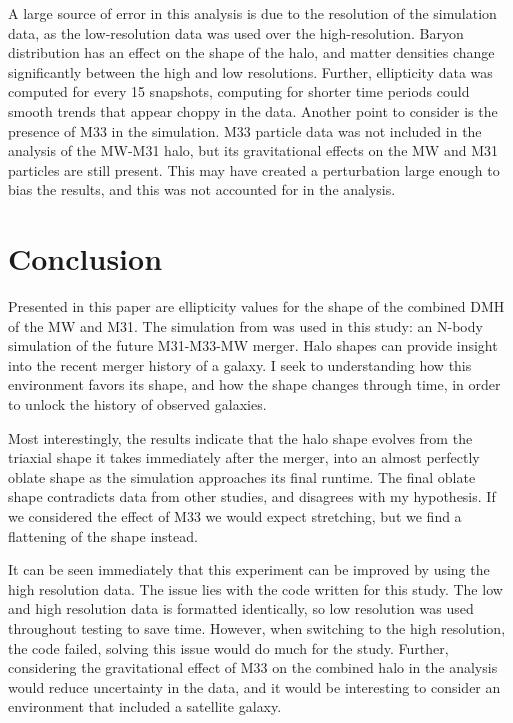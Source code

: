 \documentclass[fleqn,usenatbib]{mnras}
\begin{document}
A large source of error in this analysis is due to the resolution of the simulation data, as the low-resolution data was used over the high-resolution. Baryon distribution has an effect on the shape of the halo, and matter densities change significantly between the high and low resolutions. Further, ellipticity data was computed for every 15 snapshots, computing for shorter time periods could smooth trends that appear choppy in the data. Another point to consider is the presence of M33 in the simulation. M33 particle data was not included in the analysis of the MW-M31 halo, but its gravitational effects on the MW and M31 particles are still present. This may have created a perturbation large enough to bias the results, and this was not accounted for in the analysis.


\section{Conclusion}

Presented in this paper are ellipticity values for the shape of the combined DMH of the MW and M31. The simulation from \citet{van_der_Marel_2012} was used in this study: an N-body simulation of the future M31-M33-MW merger. Halo shapes can provide insight into the recent merger history of a galaxy. I seek to understanding how this environment favors its shape, and how the shape changes through time, in order to unlock the history of observed galaxies.

Most interestingly, the results indicate that the halo shape evolves from the triaxial shape it takes immediately after the merger, into an almost perfectly oblate shape as the simulation approaches its final runtime. The final oblate shape contradicts data from other studies, and disagrees with my hypothesis. If we considered the effect of M33 we would expect stretching, but we find a flattening of the shape instead.

It can be seen immediately that this experiment can be improved by using the high resolution data. The issue lies with the code written for this study. The low and high resolution data is formatted identically, so low resolution was used throughout testing to save time. However, when switching to the high resolution,  the code failed, solving this issue would do much for the study. Further, considering the gravitational effect of M33 on the combined halo in the analysis would reduce uncertainty in the data, and it would be interesting to consider an environment that included a satellite galaxy.
\end{document}
